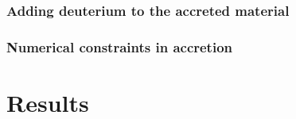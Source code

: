 \documentclass[12pt,a4paper]{article}
\newcommand{\mr}{\mathrm}
\newenvironment{outline}[1]{%
  \begin{itemize}[label=\textbullet]%
  \color{#1}%
}{%
  \end{itemize}%
}
\begin{document}
\subsubsection{Adding deuterium to the accreted material}
\label{sec:accretion_deuterium}

\subsubsection{Numerical constraints in accretion}
\label{sec:numerical_constraints}







\section{Results}
\label{sec:results}
\end{document}
